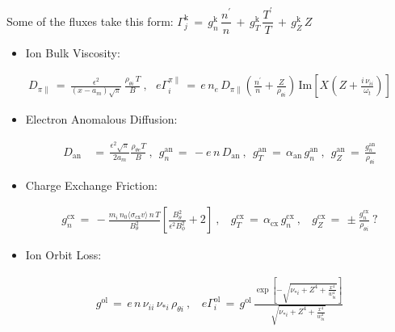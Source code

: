 \documentclass[a4paper,8pt]{article}
\providecommand{\tightlist}{%
  \setlength{\itemsep}{0pt}\setlength{\parskip}{0pt}}
\begin{document}
\normalsize

Some of the fluxes take this form:
\(\Gamma_j^\text{k} \,=\, g_n^\text{k}\,\dfrac{n^\prime}{n} \,+\, g_T^\text{k}\,\dfrac{T^\prime}{T} \,+\, g_Z^\text{k}\,Z\)

\begin{itemize}
\tightlist
\item
  Ion Bulk Viscosity: 
\end{itemize}

\small

\begin{align}
    D_{\pi\parallel} \,=\, \frac{\epsilon^2}{(x - a_m) \sqrt{\pi}}\,
        \frac{\rho_{\theta i} \, T}{B}~,~~~
    e \Gamma_i^{\pi\parallel} \,=\, e\,n_e\,D_{\pi\parallel}
        \left(\frac{n^\prime}{n} + \frac{Z}{\rho_{\theta i}}\right) \,
        \text{Im}\left[X\left(Z + \frac{i \, \nu_{ii}}{\omega_t}\right)\right]
\end{align}

\normalsize

\begin{itemize}
\tightlist
\item
  Electron Anomalous Diffusion: \small

  \begin{align}
  D_\text{an} \,&=\, \frac{\epsilon^2 \sqrt{\pi}}{2 a_m}
      \frac{\rho_{\theta e} T}{B}~,~~
      g_n^\text{an} \,=\, -e \,n\, D_\text{an}~,~~
      g_T^\text{an} \,=\, \alpha_\text{an}\, g_n^\text{an}~,~~
      g_Z^\text{an} \,=\, \frac{g_n^\text{an}}{\rho_{\theta i}}
  \end{align}

  \normalsize
\item
  Charge Exchange Friction: \small

  \begin{align}
  g_n^\text{cx} \,=\,
      -\frac{m_i \,n_0 \langle\sigma_\text{cx} v\rangle \,n \,T}{B_\theta^2}
      \left[\frac{B_\theta^2}{\epsilon^2 B_\phi^2} + 2\right]~,~~~~
      g_T^\text{cx} \,=\, \alpha_\text{cx}\,g_n^\text{cx}~,~~~~
      g_Z^\text{cx} \,=\, \pm\frac{g_n^\text{cx}}{\rho_{\theta i}}~?
  \end{align}

  \normalsize
\item
  Ion Orbit Loss: \small

  \begin{align}
  g^\text{ol} \,=\, e \,n\, \nu_{ii} \, \nu_{*i} \, \rho_{\theta i}~,~~~~
  e\Gamma_i^\text{ol} \,=\, g^\text{ol} \, \frac{
      \exp\left[-\sqrt{\nu_{*i} + Z^4 + \frac{x^4}{w_{bi}^4}}\right]}
      {\sqrt{\nu_{*i} + Z^4 + \frac{x^4}{w_{bi}^4}}}
  \end{align}

  \normalsize
\end{itemize}
\end{document}
